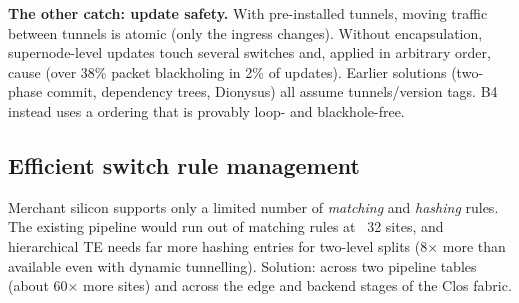 \textbf{The other catch: update safety.} With pre-installed tunnels, moving traffic between tunnels is atomic (only the ingress changes). Without encapsulation, supernode-level updates touch several switches and, applied in arbitrary order, cause  (over 38\% packet blackholing in 2\% of updates). Earlier solutions (two-phase commit, dependency trees, Dionysus) all assume tunnels/version tags. B4 instead uses a  ordering that is provably loop- and blackhole-free.

\subsection{Efficient switch rule management}
Merchant silicon supports only a limited number of \emph{matching} and \emph{hashing} rules. The existing pipeline would run out of matching rules at ~32 sites, and hierarchical TE needs far more hashing entries for two-level splits (8$\times$ more than available even with dynamic tunnelling). Solution:  across two pipeline tables (about 60$\times$ more sites) and  across the edge and backend stages of the Clos fabric.

